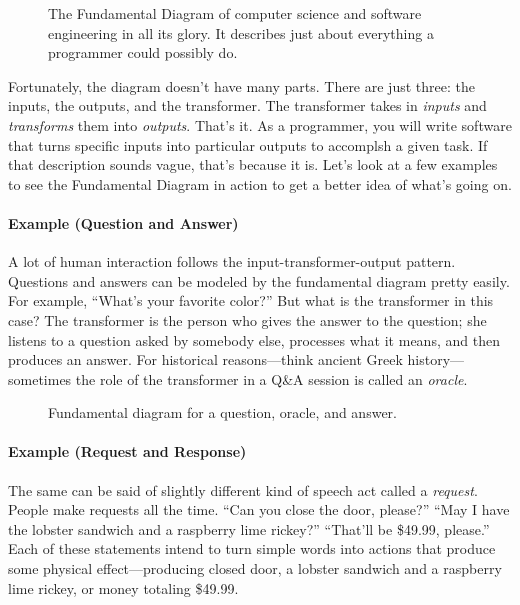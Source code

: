 \begin{figure}[h]
  
\caption{\label{fig:intro-fundemental-diagram} The Fundamental Diagram of
computer science and software engineering in all its glory. It describes just
about everything a programmer could possibly do.}
\end{figure}

Fortunately, the diagram doesn't have many parts. There are just three: the
inputs, the outputs, and the transformer. The transformer takes in \emph{inputs}
and \emph{transforms} them into \emph{outputs}. That's it. As a programmer, you
will write software that turns specific inputs into particular outputs to
accomplsh a given task. If that description sounds vague, that's because it is.
Let's look at a few examples to see the Fundamental Diagram in action to get a
better idea of what's going on.

\paragraph{Example (Question and Answer)} A lot of human interaction follows the
input-transformer-output pattern. Questions and answers can be modeled by the
fundamental diagram pretty easily. For example, ``What's your favorite
color?'' But what is the
transformer in this case? The transformer is the person who gives the answer to
the question; she listens to a question asked by somebody else, processes what
it means, and then produces an answer. For historical reasons---think ancient
Greek history---sometimes the role of the transformer in a Q\&A session is
called an \emph{oracle}.

\begin{figure}[h]
  
\caption{\label{fig:intro-example-question-answer} Fundamental diagram for a
question, oracle, and answer.}
\end{figure}

\paragraph{Example (Request and Response)}The same can be said of slightly
different kind of speech act called a \emph{request}. People make requests all
the time. ``Can you close the door, please?'' ``May I have the lobster sandwich
and a raspberry lime rickey?'' ``That'll be \$49.99, please.'' Each of these
statements intend to turn simple words into actions that produce some physical
effect---producing closed door, a lobster sandwich and a raspberry lime rickey,
or money totaling \$49.99.

